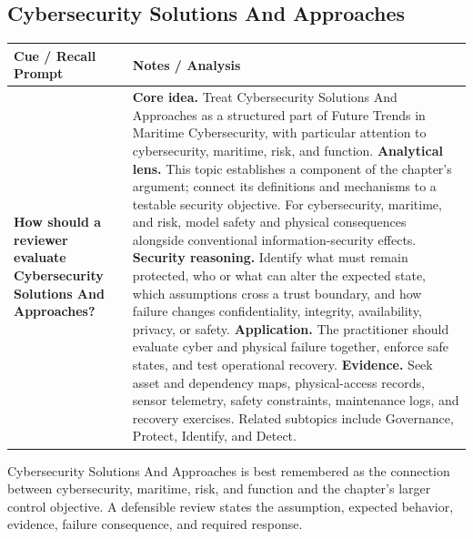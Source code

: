 \documentclass[11pt]{article}
\newcommand{\CornellHeader}{%
\rowcolor{Navy}\color{white}\bfseries Cue / Recall Prompt & \color{white}\bfseries Notes / Analysis\\\hline}
\newcommand{\CornellRow}[2]{%
\cellcolor{CueGray}\RaggedRight\textbf{#1} & \RaggedRight #2\\\hline}
\begin{document}
\subsection*{Cybersecurity Solutions And Approaches}
\begin{longtable}{>{\RaggedRight\arraybackslash}p{}|>{\RaggedRight\arraybackslash}p{}}
\CornellHeader
\CornellRow{How should a reviewer evaluate Cybersecurity Solutions And Approaches?}{\textbf{Core idea.} Treat Cybersecurity Solutions And Approaches as a structured part of Future Trends in Maritime Cybersecurity, with particular attention to cybersecurity, maritime, risk, and function. \textbf{Analytical lens.} This topic establishes a component of the chapter's argument; connect its definitions and mechanisms to a testable security objective. For cybersecurity, maritime, and risk, model safety and physical consequences alongside conventional information-security effects. \textbf{Security reasoning.} Identify what must remain protected, who or what can alter the expected state, which assumptions cross a trust boundary, and how failure changes confidentiality, integrity, availability, privacy, or safety. \textbf{Application.} The practitioner should evaluate cyber and physical failure together, enforce safe states, and test operational recovery. \textbf{Evidence.} Seek asset and dependency maps, physical-access records, sensor telemetry, safety constraints, maintenance logs, and recovery exercises. Related subtopics include Governance, Protect, Identify, and Detect.}
\end{longtable}
\begin{topicsummary}
Cybersecurity Solutions And Approaches is best remembered as the connection between cybersecurity, maritime, risk, and function and the chapter's larger control objective. A defensible review states the assumption, expected behavior, evidence, failure consequence, and required response.
\end{topicsummary}
\end{document}
